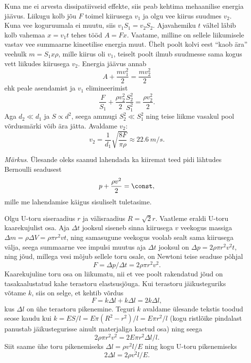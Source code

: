 \documentclass[10pt]{article}
\begin{document}
{
\solu
Kuna me ei arvesta dissipatiivseid effekte, siis peab kehtima mehaanilise energia jäävus. Liikugu kolb jõu $F$ toimel kiirusega $v_1$ ja olgu vee kiirus suudmes $v_2$. Kuna vee koguruumala ei muutu, siis $v_1S_1 = v_2S_2$. Ajavahemiku $t$ vältel
läbib kolb vahemaa $x = v_1t$ tehes tööd $A = F x$. Vaatame, milline on sellele liikumisele vastav vee summaarne kineetilise energia muut. Ühelt poolt kolvi eest \enquote{kaob ära} veehulk $m = S_1x\rho$, mille kiirus oli $v_1$, teiselt poolt ilmub suudmesse sama kogus vett liikudes kiirusega $v_2$. Energia jäävus annab
\[
A+\frac{m v_{1}^{2}}{2}=\frac{m v_{2}^{2}}{2}
\]
ehk peale asendamist ja $v_1$ elimineerimist
\[
\frac{F}{S_{1}}+\frac{\rho v_{2}^{2}}{2} \frac{S_{2}^{2}}{S_{1}^{2}}=\frac{\rho v_{2}^{2}}{2}.
\]
Aga $d_2 \ll d_1$ ja $S \propto d^2$, seega ammugi $S_2^2 \ll S_1^2$ ning teise liikme vasakul pool võrdusmärki võib ära jätta. Avaldame $v_2$:
\[
v_{2}=\frac{1}{d_{1}} \sqrt{\frac{8 F}{\pi \rho}} \approx \SI{22,6}{m/s}.
\]

\emph{Märkus}. Ülesande oleks saanud lahendada ka kiiremat teed pidi lähtudes Bernoulli seadusest
\[
p+\frac{\rho v^{2}}{2}=\const,
\]
mille me lahendamise käigus sisuliselt tuletasime.
\probend
\bigskip


\solu
Olgu U-toru siseraadius $r$ ja välisraadius $R = \sqrt 2 r$. Vaatleme eraldi U-toru kaarekujulist osa. Aja $\Delta t$ jooksul siseneb sinna kiirusega $v$ veekogus massiga $\Delta m = \rho \Delta V = \rho \pi r^2vt$, ning samasugune veekogus voolab sealt sama kiirusega välja, seega summaarne vee impulsi muutus aja $\Delta t$ jooksul on $\Delta p= 2\rho\pi r^2v^2 t$, ning jõud, millega vesi mõjub sellele toru osale, on Newtoni teise seaduse põhjal
\[
F=\Delta p/\Delta t= 2\rho\pi r^2v^2. 
\]
Kaarekujuline toru osa on liikumatu, nii et vee poolt rakendatud jõud on tasakaalustatud kahe terastoru elastsusjõuga. Kui terastoru jäikusteguriks võtame $k$, siis on selge, et kehtib võrdus
\[
F = k\Delta l+k\Delta l = 2k\Delta l,
\] 
kus $\Delta l$ on ühe terastoru pikenemine. Teguri $k$ avaldame ülesande tekstis toodud seose kaudu kui $k = ES/l = E\pi \left(R^2 - r^2\right)/l = E\pi r^2/l$ (kogu ristlõike pindalast panustab jäikustegurisse ainult materjaliga kaetud osa) ning seega 
\[
2\rho\pi r^2 v^2= 2E\pi r^2\Delta l/l.
\]
Siit saame ühe toru pikenemiseks $\Delta l=\rho v^2 l/E$ ning kogu U-toru pikenemiseks 
\[
2\Delta l= 2\rho v^2 l/E.
\]
\probend
\bigskip

}
\end{document}
